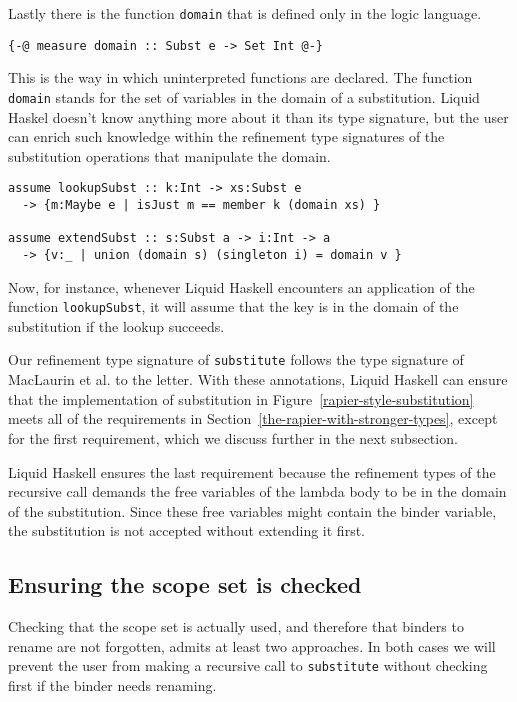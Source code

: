 \documentclass[acmtog, anonymous]{acmart}
\newcommand{\tc}[1]{{\small\texttt{#1}}}
\begin{document}
Lastly there is the function \tc{domain} that is defined only in the logic
language.

\begin{verbatim}
{-@ measure domain :: Subst e -> Set Int @-}
\end{verbatim}

This is the way in which uninterpreted functions are declared. The function
\tc{domain} stands for the set of variables in the domain of a substitution.
Liquid Haskel doesn't know anything more about it than its type signature,
but the user can enrich such knowledge within the refinement type signatures
of the substitution operations that manipulate the domain.

\begin{verbatim}
assume lookupSubst :: k:Int -> xs:Subst e
  -> {m:Maybe e | isJust m == member k (domain xs) }

assume extendSubst :: s:Subst a -> i:Int -> a
  -> {v:_ | union (domain s) (singleton i) = domain v }
\end{verbatim}

Now, for instance, whenever Liquid Haskell encounters an application
of the function \tc{lookupSubst}, it will assume that the key is in the domain
of the substitution if the lookup succeeds.

Our refinement type signature of \tc{substitute} follows the type signature of
MacLaurin et al. to the letter. With these annotations, Liquid Haskell can ensure that the
implementation of substitution in Figure~\ref{rapier-style-substitution} meets
all of the requirements in Section~\ref{the-rapier-with-stronger-types}, except
for the first requirement, which we discuss further in the next subsection.

Liquid Haskell ensures the last requirement because the
refinement types of the recursive call demands the free variables of the lambda
body to be in the domain of the substitution. Since these free variables might
contain the binder variable, the substitution is not accepted without extending
it first.

\subsection{Ensuring the scope set is checked}

Checking that the scope set is actually used, and therefore that binders to rename
are not forgotten, admits at least two approaches. In both cases we will prevent
the user from making a recursive call to \tc{substitute} without checking first
if the binder needs renaming.
\end{document}

